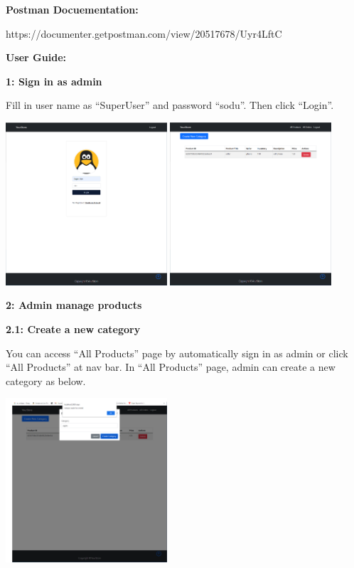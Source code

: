\documentclass[12pt]{article}
\begin{document}
\newpage

\textbf{Postman Docuementation:}

\begin{center}
    https://documenter.getpostman.com/view/20517678/Uyr4LftC
\end{center}

\newpage
\textbf{User Guide:}

\vspace*{5mm}
\textbf{1: Sign in as admin}

Fill in user name as “SuperUser” and password “sodu”. Then click “Login”.

\includegraphics[width=0.45\textwidth]{UserGuideImage/1.png}
\includegraphics[width=0.45\textwidth]{UserGuideImage/2.png}

\vspace*{5mm}
\textbf{2: Admin manage products}

\hspace*{5mm}\textbf{2.1: Create a new category}

You can access “All Products” page by automatically sign in as admin or click “All Products”
at nav bar. In “All Products” page, admin can create a new category as below.

\includegraphics[width=0.45\textwidth]{UserGuideImage/3.png}
\end{document}
